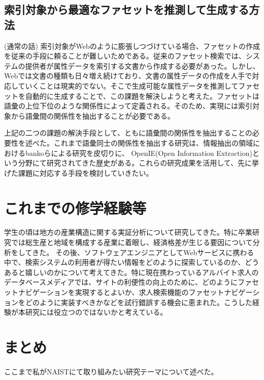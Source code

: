 \documentclass[a4j,11pt, twocolumn]{jarticle}
\begin{document}
 \subsection{索引対象から最適なファセットを推測して生成する方法}
 (通常の話)
 索引対象がWebのように膨張しつづけている場合、ファセットの作成を従来の手段に頼ることが難しいためである。従来のファセット検索では、システムの提供者が属性データを索引する文書から作成する必要があった。しかし、Webでは文書の種類も日々増え続けており、文書の属性データの作成を人手で対応していくことは現実的でない。そこで生成可能な属性データを推測してファセットを自動的に生成することで、この課題を解決しようと考えた。ファセットは語彙の上位下位のような関係性によって定義される。そのため、実現には索引対象から語彙間の関係性を抽出することが必要である。

上記の二つの課題の解決手段として、ともに語彙間の関係性を抽出することの必要性を述べた。これまで語彙同士の関係性を抽出する研究は、情報抽出の領域におけるbankoらによる研究\cite{banko}を皮切りに、 OpenIE(Open Information Extraction)という分野にて研究されてきた歴史がある\cite{niklaus}。これらの研究成果を活用して、先に挙げた課題に対応する手段を検討していきたい。
\section{これまでの修学経験等}
 学生の頃は地方の産業構造に関する実証分析について研究してきた。特に卒業研究では総生産と地域を構成する産業に着眼し、経済格差が生じる要因について分析をしてきた。
 その後、ソフトウェアエンジニアとしてWebサービスに携わる中で、検索システムの利用者が得たい情報をどのように探索しているのか、どうあると嬉しいのかについて考えてきた。特に現在携わっているアルバイト求人のデータベースメディアでは、サイトの利便性の向上のために、どのようにファセットナビゲーションを実現するとよいか、求人検索機能のファセットナビゲーションをどのように実装すべきかなどを試行錯誤する機会に恵まれた。こうした経験が本研究には役立つのではないかと考えている。

\section{まとめ}
ここまで私がNAISTにて取り組みたい研究テーマについて述べた。
\end{document}
